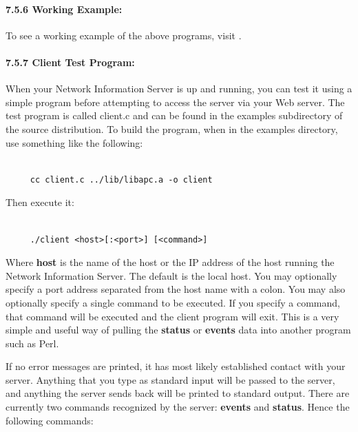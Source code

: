 {{{{{{{{\label{Working-Example}

\paragraph*{7.5.6 Working Example:}

\label{index-CGI_002c-working-example-134}
\label{index-Example_002c-CGI-135}
To see a working example of the above programs, visit 
. 

\label{Client-Test-Program}

\paragraph*{7.5.7 Client Test Program:}

\label{index-Client-Test-program-136}
When your Network Information Server is up and running, you can test it using
a simple program before attempting to access the server via your Web server.
The test program is called client.c and can be found in the examples
subdirectory of the source distribution. To build the program, when in the
examples directory, use something like the following: 

\footnotesize
\begin{verbatim}
     
     cc client.c ../lib/libapc.a -o client
\end{verbatim}
\normalsize

Then execute it: 

\footnotesize
\begin{verbatim}
     
     ./client <host>[:<port>] [<command>]
\end{verbatim}
\normalsize

Where {\bf host} is the name of the host or the IP address of the host running
the Network Information Server. The default is the local host. You may
optionally specify a port address separated from the host name with a colon.
You may also optionally specify a single command to be executed. If you
specify a command, that command will be executed and the client program will
exit. This is a very simple and useful way of pulling the {\bf status} or {\bf
events} data into another program such as Perl.  

If no error messages are printed, it has most likely established contact with
your server. Anything that you type as standard input will be passed to the
server, and anything the server sends back will be printed to standard output.
There are currently two commands recognized by the server: {\bf events} and
{\bf status}.  Hence the following commands: 

}}}}}}}}
